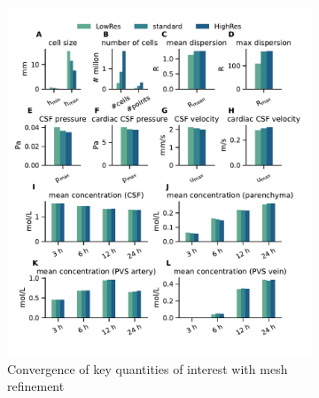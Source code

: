 \documentclass[fleqn,10pt]{wlscirep}
\begin{document}
\begin{figure}
    \centering
    \begin{subfigure}[b]{0.49\textwidth}
        \centering
        \includegraphics[trim={0.5cm 1cm 0.05cm 0.8cm}, clip, width = 1.05 \linewidth]{figures/mesh_refinement.pdf}
        \caption{Convergence of key quantities of interest with mesh refinement}
        \label{fig:mesh_convergence}
    \end{subfigure}
    \begin{subfigure}[b]{0.49\textwidth}
        \centering

\end{subfigure}
\end{figure}
\end{document}
